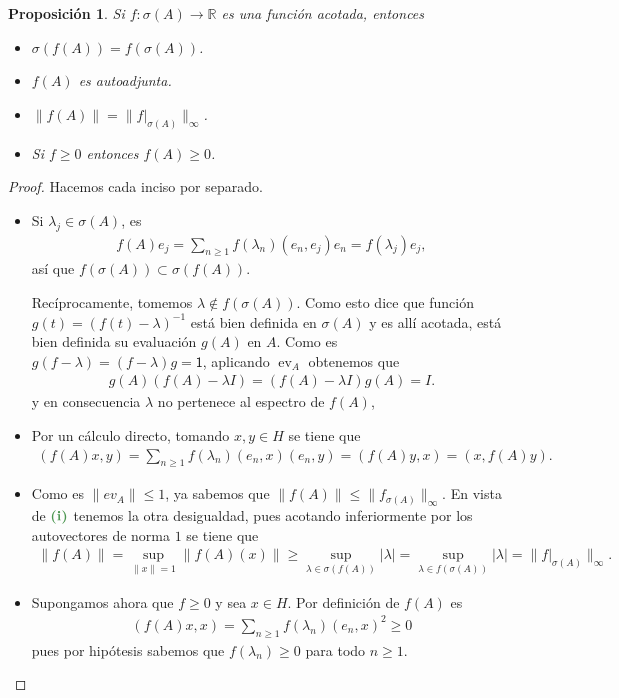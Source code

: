 \documentclass[11pt]{report}
\theoremstyle{colored}
\newtheorem{proposition}{Proposición}[section]
\newcommand{\R}{\mathbb{R}}
\newcommand{\ev}{\operatorname{ev}}
\newcommand{\ip}[1]{( #1 )}
\newcommand{\paint}[1]{\color{color}{#1}}
\newcommand{\tpaint}[1]{\paint{\textbf{#1}}}
\begin{document}
\begin{proposition} Si $f : \sigma(A) \to \R$ es una función acotada, entonces
\begin{itemize}
\item[(i)] $\sigma(f(A)) = f(\sigma(A))$.
\item[(ii)] $f(A)$ es autoadjunta.
\item[(iii)] $\|f(A)\| = \|f|_{\sigma(A)}\|_{\infty}$.
\item[(iv)] Si $f \geq 0$ entonces $f(A) \geq 0$.
\end{itemize}
\end{proposition}
\begin{proof} Hacemos cada inciso por separado. 
\begin{itemize}[listparindent = \parindent]
\item[(i)] Si $\lambda_j \in \sigma(A)$, es
\begin{align*}
f(A)e_j = \sum_{n \geq 1}f(\lambda_n)(e_n,e_j)e_n = f(\lambda_j)e_j,
\end{align*}
así que $f(\sigma(A)) \subset \sigma(f(A))$. 

Recíprocamente, tomemos $\lambda \not \in f(\sigma(A))$. Como esto dice que función $g(t) = (f(t)-\lambda)^{-1}$ está bien definida en $\sigma(A)$ y es allí acotada, está bien definida su evaluación $g(A)$ en $A$. Como es $g(f-\lambda) = (f-\lambda)g = \mathsf{1}$, aplicando $\ev_A$ obtenemos que
\begin{align*}
g(A)(f(A)- \lambda I) = (f(A) - \lambda I)g(A) = I.
\end{align*}
y en consecuencia $\lambda$ no pertenece al espectro de $f(A)$,
\item[(ii)] Por un cálculo directo, tomando $x,y \in H$ se tiene que 
\begin{align*}
\ip{f(A)x, y} = \sum_{n \geq 1} f(\lambda_n) \ip{e_n, x}\ip{e_n,y}  = \ip{f(A)y,x} = \ip{x, f(A)y}.
\end{align*}
\item[(iii)] Como es $\|ev_A\| \leq 1$, ya sabemos que $\|f(A)\| \leq \|f_{\sigma(A)}\|_\infty$. En vista de $\tpaint{(i)}$ tenemos la otra desigualdad, pues acotando inferiormente por los autovectores de norma $1$ se tiene que 
\begin{align*}
\|f(A)\| = \sup_{\|x\| = 1}\|f(A)(x)\| \geq \sup_{\lambda \in \sigma(f(A))}|\lambda| = \sup_{\lambda \in f(\sigma(A))}|\lambda| = \|f|_{\sigma(A)}\|_\infty.
\end{align*}
\item[(iv)] Supongamos ahora que $f \geq 0$ y sea $x \in H$. Por definición de $f(A)$ es 
\begin{align*}
(f(A)x,x) = \sum_{n \geq 1} f(\lambda_n) \ip{e_n, x}^2 \geq 0
\end{align*}
pues por hipótesis sabemos que $f(\lambda_n) \geq 0$ para todo $n \geq 1$.
\end{itemize}
\end{proof}
\end{document}
